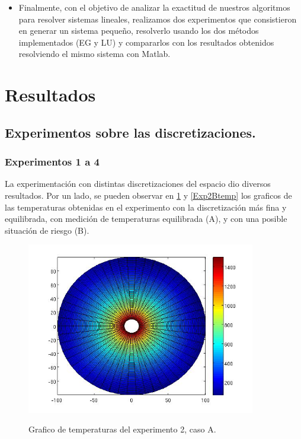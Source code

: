 \documentclass[12pt,a4paper]{article}
\begin{document}
\begin{itemize}
    \item Finalmente, con el objetivo de analizar la exactitud de nuestros algoritmos para resolver sistemas lineales, realizamos dos experimentos que consistieron en generar un sistema pequeño, resolverlo usando los dos métodos implementados (EG y LU) y compararlos con los resultados obtenidos resolviendo el mismo sistema con Matlab.

\end{itemize}

\section{Resultados}

\subsection{Experimentos sobre las discretizaciones.}    

\subsubsection{Experimentos 1 a 4}

La experimentación con distintas discretizaciones del espacio dio diversos resultados. Por un lado, se pueden observar en
\ref{Exp2Atemp} y \ref{Exp2Btemp} los graficos de las temperaturas obtenidas en el experimento con la discretización más fina y equilibrada, con medición de temperaturas equilibrada (A), y con una posible situación de riesgo (B). 

\begin{figure}[h!]
\centering
\caption{Grafico de temperaturas del experimento 2, caso A.}
\includegraphics[width=10cm]{test5050atemp.jpg}
\label{Exp2Atemp}
\end{figure}
\end{document}
